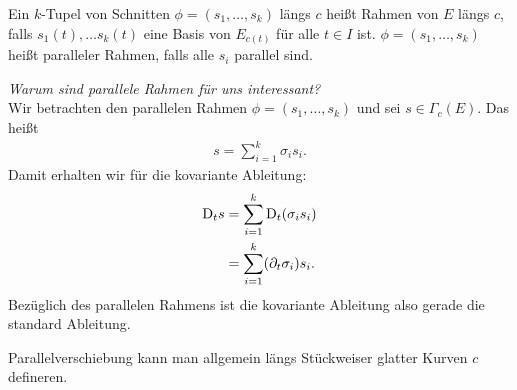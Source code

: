 \begin{defs}
Ein $k$-Tupel von Schnitten $\phi = (s_1, \dots, s_k)$ längs $c$ heißt Rahmen von $E$ längs $c$, falls $s_1(t), \dots s_k(t)$ eine Basis von $E_{c(t)}$ für alle $t \in I$ ist.
$\phi = (s_1, \dots, s_k)$ heißt paralleler Rahmen, falls alle $s_i$ parallel sind.
\end{defs}
\textit{Warum sind parallele Rahmen für uns interessant?}\\
Wir betrachten den parallelen Rahmen $\phi = (s_1, \dots, s_k)$ und sei $s \in \Gamma_c (E)$.
Das heißt 
\begin{align}
s= \sum^{k}_{i=1} \sigma_i s_i.
\end{align}
Damit erhalten wir für die kovariante Ableitung:
\begin{align}
\mathrm{D}_t s &= \sum^{k}_{i=1} \mathrm{D}_t (\sigma_i s_i)\\
&= \sum^{k}_{i=1} (\partial_t \sigma_i) s_i. 
\end{align}
Bezüglich des parallelen Rahmens ist die kovariante Ableitung also gerade die standard Ableitung.
\begin{bem}
Parallelverschiebung kann man allgemein längs Stückweiser glatter Kurven $c$ defineren.
\end{bem}


